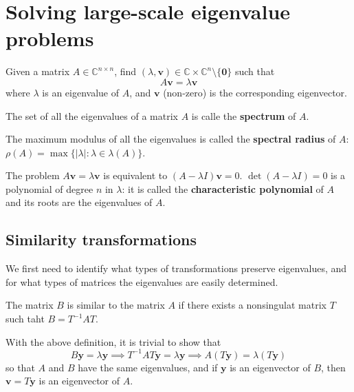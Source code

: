 \section{Solving large-scale eigenvalue problems}

\begin{tcolorbox}[
        title=Eigenvalue problem
    ]
    Given a matrix $A \in \mathbb{C}^{n \times n}$, find $(\lambda, \mathbf{v}) \in \mathbb{C} \times \mathbb{C}^n \setminus \{ \mathbf 0 \}$ such that
    $$
        A \mathbf{v} = \lambda \mathbf{v}
    $$
    where $\lambda$ is an eigenvalue of $A$,
    and $\mathbf v$ (non-zero) is the corresponding eigenvector.
\end{tcolorbox}

The set of all the eigenvalues of a matrix $A$ is calle the \textbf{spectrum} of $A$.

The maximum modulus of all the eigenvalues is called the \textbf{spectral radius} of $A$:
$\rho(A) = \max \{ |\lambda| : \lambda \in \lambda(A) \}$.

The problem $A \mathbf v = \lambda \mathbf v$ is equivalent to $(A - \lambda I) \mathbf v = 0$.
$\det (A - \lambda I) = 0$ is a polynomial of degree $n$ in $\lambda$:
it is called the \textbf{characteristic polynomial} of $A$ and its roots are the eigenvalues of $A$.

\subsection{Similarity transformations}

We first need to identify what types of transformations preserve eigenvalues,
and for what types of matrices the eigenvalues are easily determined.

\begin{tcolorbox}[title=Definition]
    The matrix $B$ is similar to the matrix $A$ if there exists a nonsingulat matrix $T$ such taht $B = T^{-1} A T$.
\end{tcolorbox}

With the above definition, it is trivial to show that
$$
    B \mathbf y = \lambda \mathbf y
    \implies
    T^{-1} A T \mathbf y = \lambda \mathbf y
    \implies
    A(T \mathbf y) = \lambda (T \mathbf y)
$$
so that $A$ and $B$ have the same eigenvalues,
and if $\mathbf y$ is an eigenvector of $B$,
then $\mathbf v = T\mathbf y$ is an eigenvector of $A$.